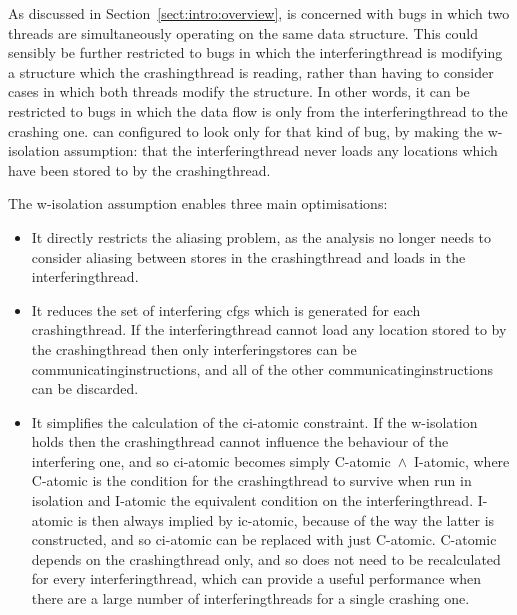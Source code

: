 
As discussed in Section~\ref{sect:intro:overview}, {\technique} is
concerned with bugs in which two threads are simultaneously operating
on the same data structure.  This could sensibly be further restricted
to bugs in which the \gls{interferingthread} is modifying a structure
which the \gls{crashingthread} is reading, rather than having to
consider cases in which both threads modify the structure.  In other
words, it can be restricted to bugs in which the data flow is only
from the \gls{interferingthread} to the crashing one.
{\Implementation} can configured to look only for that kind of bug, by
making the \gls{w-isolation} assumption: that the
\gls{interferingthread} never loads any locations which have been
stored to by the \gls{crashingthread}.

The \gls{w-isolation} assumption enables three main optimisations:

\begin{itemize}
\item
  It directly restricts the aliasing problem, as the analysis no
  longer needs to consider aliasing between stores in the
  \gls{crashingthread} and loads in the \gls{interferingthread}.
\item
  It reduces the set of interfering \glspl{cfg} which is generated for
  each \gls{crashingthread}.  If the \gls{interferingthread} cannot
  load any location stored to by the \gls{crashingthread} then only
  \glspl{interferingstore} can be \glspl{communicatinginstruction},
  and all of the other \glspl{communicatinginstruction} can be
  discarded.
\item
  It simplifies the calculation of the \gls{ci-atomic} constraint.  If
  the \gls{w-isolation} holds then the \gls{crashingthread} cannot
  influence the behaviour of the interfering one, and so
  \gls{ci-atomic} becomes simply C-atomic~$\wedge$~I-atomic, where
  C-atomic is the condition for the \gls{crashingthread} to survive
  when run in isolation and I-atomic the equivalent condition on the
  \gls{interferingthread}.  I-atomic is then always implied by
  \gls{ic-atomic}, because of the way the latter is constructed, and
  so \gls{ci-atomic} can be replaced with just C-atomic.  C-atomic
  depends on the \gls{crashingthread} only, and so does not need to be
  recalculated for every \gls{interferingthread}, which can provide a
  useful performance when there are a large number of
  \glspl{interferingthread} for a single crashing one.
\end{itemize}

